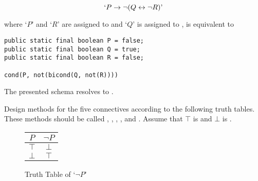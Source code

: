 
\[
    `P \to \lnot (Q \leftrightarrow \lnot R)\textrm'
\]

\noindent where `$P$' and `$R$' are assigned to  and `$Q$' is assigned to , is equivalent to

\par{
\begin{verbatim}
public static final boolean P = false;
public static final boolean Q = true;
public static final boolean R = false;

cond(P, not(bicond(Q, not(R))))
\end{verbatim}
}

\noindent The presented schema resolves to .

\noindent Design methods for the five connectives according to the following truth tables. These methods should be called , , , , and . Assume that $\top$ is  and $\bot$ is .
\captionsetup[subfigure]{labelformat=empty}
\captionsetup[figure]{labelformat=empty}%
\begin{figure}[H]
\begin{center}
    \begin{tabular}{c|c}
         $P$&$\lnot{P}$\\
         \hline
         $\top$&$\bot$\\
         $\bot$&$\top$
    \end{tabular}
\end{center}
\caption{Truth Table of `$\lnot{P}$'}
\label{fig:ttnotp}
\end{figure}


